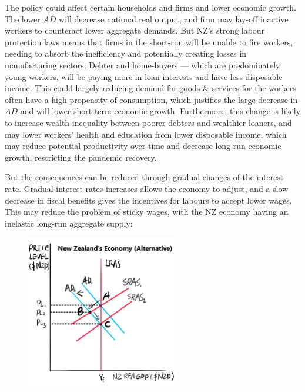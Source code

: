 \documentclass[a4paper,12pt]{article}
\begin{document}

The policy could affect certain households and firms and lower economic growth. The lower $AD$ will decrease national real output, and firm may lay-off inactive workers to counteract lower aggregate demands. But NZ's strong labour protection laws means that firms in the short-run will be unable to fire workers, needing to absorb the inefficiency and potentially creating losses in manufacturing sectors; Debter and home-buyers --- which are predominately young workers, will be paying more in loan interests and have less disposable income. This could largely reducing demand for goods \& services for the workers often have a high propensity of consumption, which justifies the large decrease in $AD$ and will lower short-term economic growth. Furthermore, this change is likely to increase wealth inequality between poorer debters and wealthier loaners, and may lower workers' health and education from lower disposable income, which may reduce potential productivity over-time and decrease long-run economic growth, restricting the pandemic recovery.


But the consequences can be reduced through gradual changes of the interest rate. Gradual interest rates increases allows the economy to adjust, and a slow decrease in fiscal benefits gives the incentives for labours to accept lower wages. This may reduce the problem of sticky wages, with the NZ economy having an inelastic long-run aggregate supply:

\begin{figure}[H]
    \centering
    \includegraphics[width=0.6\textwidth]{assets/macro_alt.png}
\end{figure}
\end{document}
